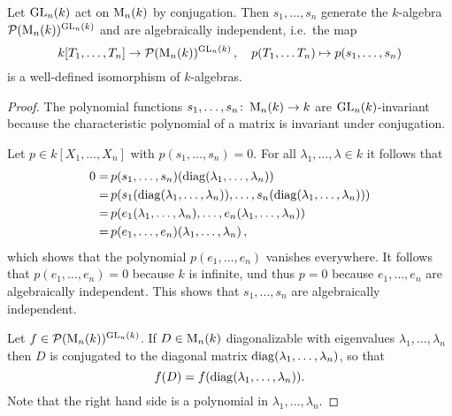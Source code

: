 \begin{theorem}
  \label{theorem: GLn invariants}
  Let $\operatorname{GL}_n(k)$ act on $\operatorname{M}_n(k)$ by conjugation.
  Then $s_1, \dotsc, s_n$ generate the $k$-algebra $\mathcal{P}(\operatorname{M}_n(k))^{\operatorname{GL}_n(k)}$ and are algebraically independent, i.e.\ the map
  \[
            k[T_1, \dotsc, T_n]
    \to     \mathcal{P}(\operatorname{M}_n(k))^{\operatorname{GL}_n(k)} \,,
    \quad   p(T_1, \dotsc T_n)
    \mapsto p(s_1, \dotsc, s_n)
  \]
  is a well-defined isomorphism of $k$-algebras.
\end{theorem}
\begin{proof}
  The polynomial functions $s_1, \dotsc, s_n \colon \operatorname{M}_n(k) \to k$ are $\operatorname{GL}_n(k)$-invariant because the characteristic polynomial of a matrix is invariant under conjugation.
  
  Let $p \in k[X_1, \dotsc, X_n]$ with $p(s_1, \dotsc, s_n) = 0$.
  For all $\lambda_1, \dotsc, \lambda \in k$ it follows that
  \begin{align*}
          0
    =&\,  p(s_1, \dotsc, s_n)( \operatorname{diag}(\lambda_1, \dotsc, \lambda_n) )  \\
    =&\,  p( s_1(\operatorname{diag}(\lambda_1, \dotsc, \lambda_n)), \dotsc, s_n(\operatorname{diag}(\lambda_1, \dotsc, \lambda_n)) ) \\
    =&\,  p( e_1(\lambda_1, \dotsc, \lambda_n) , \dotsc, e_n(\lambda_1, \dotsc, \lambda_n) )  \\
    =&\,  p(e_1, \dotsc, e_n)(\lambda_1, \dotsc, \lambda_n) \,,
  \end{align*}
  which shows that the polynomial $p(e_1, \dotsc, e_n)$ vanishes everywhere.
  It follows that $p(e_1, \dotsc, e_n) = 0$ because $k$ is infinite, und thus $p = 0$ because $e_1, \dotsc, e_n$ are algebraically independent.
  This shows that $s_1, \dotsc, s_n$ are algebraically independent.
  
  Let $f \in \mathcal{P}(\operatorname{M}_n(k))^{\operatorname{GL}_n(k)}$.
  If $D \in \operatorname{M}_n(k)$ diagonalizable with eigenvalues $\lambda_1, \dotsc, \lambda_n$ then $D$ is conjugated to the diagonal matrix $\operatorname{diag}(\lambda_1, \dotsc, \lambda_n)$, so that
  \begin{equation}
  \label{equation: reduction to diagonalizable}
      f(D)
    = f(\operatorname{diag}(\lambda_1, \dotsc, \lambda_n)).
  \end{equation}
  Note that the right hand side is a polynomial in $\lambda_1, \dotsc, \lambda_n$.
  

\end{proof}

